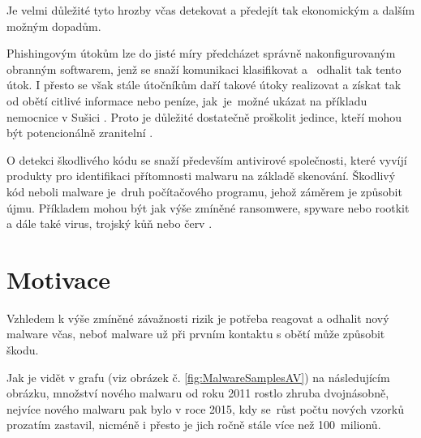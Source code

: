 Je velmi důležité tyto hrozby včas detekovat a předejít tak ekonomickým a dalším možným dopadům. 

Phishingovým útokům lze do jisté míry předcházet správně nakonfigurovaným obranným softwarem, jenž se snaží komunikaci klasifikovat a~ odhalit tak tento útok. I přesto se však stále útočníkům daří takové útoky realizovat a získat tak od obětí citlivé informace nebo peníze, jak~je~možné ukázat na příkladu nemocnice v Sušici \cite{nemocnice_phishing}. Proto je důležité dostatečně proškolit jedince, kteří mohou být potencionálně zranitelní \cite{antiphishing_solution}.


O detekci škodlivého kódu se snaží především antivirové společnosti, které vyvíjí produkty pro identifikaci přítomnosti malwaru na základě skenování. Škodlivý kód neboli malware je~druh počítačového programu, jehož záměrem je způsobit újmu. Příkladem mohou být jak výše zmíněné ransomwere, spyware nebo rootkit a dále také virus, trojský kůň nebo červ \cite{1425057}. 






\section{Motivace}

Vzhledem k výše zmíněné závažnosti rizik je potřeba reagovat a odhalit nový malware včas, neboť malware už při prvním kontaktu s obětí může způsobit škodu.

Jak je vidět v grafu (viz obrázek č. \ref{fig:MalwareSamplesAV}) na následujícím obrázku, množství nového malwaru od roku 2011 rostlo zhruba dvojnásobně, nejvíce nového malwaru pak bylo v roce 2015, kdy se~růst počtu nových vzorků prozatím zastavil, nicméně i přesto je jich ročně stále více než 100~milionů.

